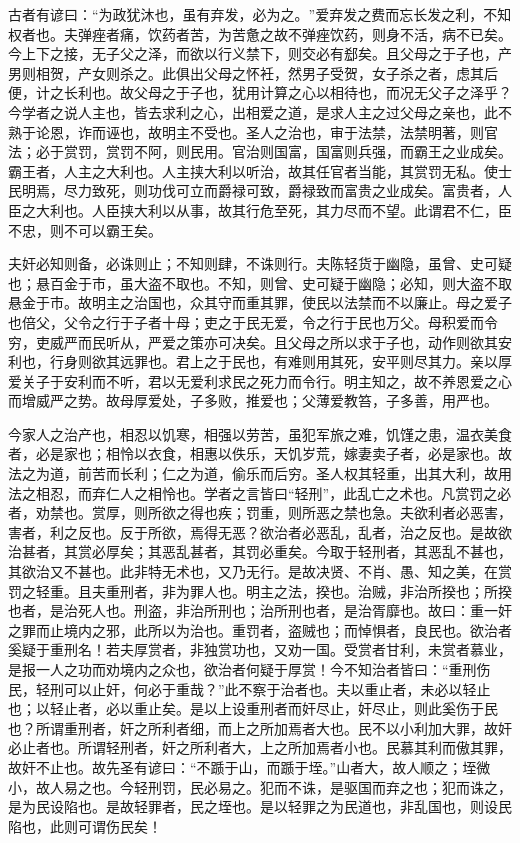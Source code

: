 \documentclass[]{article}
\begin{document}
古者有谚曰：``为政犹沐也，虽有弃发，必为之。''爱弃发之费而忘长发之利，不知权者也。夫弹痤者痛，饮药者苦，为苦惫之故不弹痤饮药，则身不活，病不已矣。今上下之接，无子父之泽，而欲以行义禁下，则交必有郄矣。且父母之于子也，产男则相贺，产女则杀之。此俱出父母之怀衽，然男子受贺，女子杀之者，虑其后便，计之长利也。故父母之于子也，犹用计算之心以相待也，而况无父子之泽乎？今学者之说人主也，皆去求利之心，出相爱之道，是求人主之过父母之亲也，此不熟于论恩，诈而诬也，故明主不受也。圣人之治也，审于法禁，法禁明著，则官法；必于赏罚，赏罚不阿，则民用。官治则国富，国富则兵强，而霸王之业成矣。霸王者，人主之大利也。人主挟大利以听治，故其任官者当能，其赏罚无私。使士民明焉，尽力致死，则功伐可立而爵禄可致，爵禄致而富贵之业成矣。富贵者，人臣之大利也。人臣挟大利以从事，故其行危至死，其力尽而不望。此谓君不仁，臣不忠，则不可以霸王矣。

夫奸必知则备，必诛则止；不知则肆，不诛则行。夫陈轻货于幽隐，虽曾、史可疑也；悬百金于市，虽大盗不取也。不知，则曾、史可疑于幽隐；必知，则大盗不取悬金于市。故明主之治国也，众其守而重其罪，使民以法禁而不以廉止。母之爱子也倍父，父令之行于子者十母；吏之于民无爱，令之行于民也万父。母积爱而令穷，吏威严而民听从，严爱之策亦可决矣。且父母之所以求于子也，动作则欲其安利也，行身则欲其远罪也。君上之于民也，有难则用其死，安平则尽其力。亲以厚爱关子于安利而不听，君以无爱利求民之死力而令行。明主知之，故不养恩爱之心而增威严之势。故母厚爱处，子多败，推爱也；父薄爱教笞，子多善，用严也。

今家人之治产也，相忍以饥寒，相强以劳苦，虽犯军旅之难，饥馑之患，温衣美食者，必是家也；相怜以衣食，相惠以佚乐，天饥岁荒，嫁妻卖子者，必是家也。故法之为道，前苦而长利；仁之为道，偷乐而后穷。圣人权其轻重，出其大利，故用法之相忍，而弃仁人之相怜也。学者之言皆曰``轻刑''，此乱亡之术也。凡赏罚之必者，劝禁也。赏厚，则所欲之得也疾；罚重，则所恶之禁也急。夫欲利者必恶害，害者，利之反也。反于所欲，焉得无恶？欲治者必恶乱，乱者，治之反也。是故欲治甚者，其赏必厚矣；其恶乱甚者，其罚必重矣。今取于轻刑者，其恶乱不甚也，其欲治又不甚也。此非特无术也，又乃无行。是故决贤、不肖、愚、知之美，在赏罚之轻重。且夫重刑者，非为罪人也。明主之法，揆也。治贼，非治所揆也；所揆也者，是治死人也。刑盗，非治所刑也；治所刑也者，是治胥靡也。故曰：重一奸之罪而止境内之邪，此所以为治也。重罚者，盗贼也；而悼惧者，良民也。欲治者奚疑于重刑名！若夫厚赏者，非独赏功也，又劝一国。受赏者甘利，未赏者慕业，是报一人之功而劝境内之众也，欲治者何疑于厚赏！今不知治者皆曰：``重刑伤民，轻刑可以止奸，何必于重哉？''此不察于治者也。夫以重止者，未必以轻止也；以轻止者，必以重止矣。是以上设重刑者而奸尽止，奸尽止，则此奚伤于民也？所谓重刑者，奸之所利者细，而上之所加焉者大也。民不以小利加大罪，故奸必止者也。所谓轻刑者，奸之所利者大，上之所加焉者小也。民慕其利而傲其罪，故奸不止也。故先圣有谚曰：``不踬于山，而踬于垤。''山者大，故人顺之；垤微小，故人易之也。今轻刑罚，民必易之。犯而不诛，是驱国而弃之也；犯而诛之，是为民设陷也。是故轻罪者，民之垤也。是以轻罪之为民道也，非乱国也，则设民陷也，此则可谓伤民矣！
\end{document}
